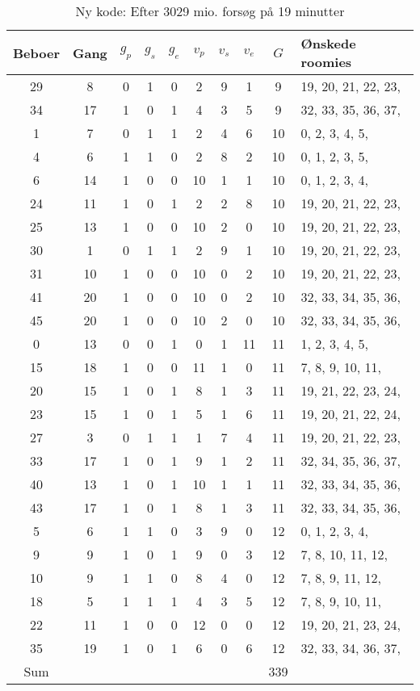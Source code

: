\documentclass[article,oneside,11pt,a4paper]{memoir}
\newenvironment{assignment}[1]{
\begin{table}[h]
\caption{#1}
\footnotesize
\begin{center}
\begin{tabular}{cccccccccl}
\toprule
Beboer & Gang & $g_p$ & $g_s$ & $g_e$ & $v_p$ & $v_s$ & $v_e$ & $G$ & Ønskede roomies \\ \midrule
}{
\bottomrule
\end{tabular}
\end{center}
\end{table}

}
\begin{document}
\begin{assignment}{Ny kode: Efter 3029 mio. forsøg på 19 minutter}
    29 &    8 &   0 &   1 &   0 &   2 &   9 &   1 &  9 &  19, 20, 21, 22, 23, \\
    34 &   17 &   1 &   0 &   1 &   4 &   3 &   5 &  9 &  32, 33, 35, 36, 37, \\
     1 &    7 &   0 &   1 &   1 &   2 &   4 &   6 & 10 &   0,  2,  3,  4,  5, \\
     4 &    6 &   1 &   1 &   0 &   2 &   8 &   2 & 10 &   0,  1,  2,  3,  5, \\
     6 &   14 &   1 &   0 &   0 &  10 &   1 &   1 & 10 &   0,  1,  2,  3,  4, \\
    24 &   11 &   1 &   0 &   1 &   2 &   2 &   8 & 10 &  19, 20, 21, 22, 23, \\
    25 &   13 &   1 &   0 &   0 &  10 &   2 &   0 & 10 &  19, 20, 21, 22, 23, \\
    30 &    1 &   0 &   1 &   1 &   2 &   9 &   1 & 10 &  19, 20, 21, 22, 23, \\
    31 &   10 &   1 &   0 &   0 &  10 &   0 &   2 & 10 &  19, 20, 21, 22, 23, \\
    41 &   20 &   1 &   0 &   0 &  10 &   0 &   2 & 10 &  32, 33, 34, 35, 36, \\
    45 &   20 &   1 &   0 &   0 &  10 &   2 &   0 & 10 &  32, 33, 34, 35, 36, \\
     0 &   13 &   0 &   0 &   1 &   0 &   1 &  11 & 11 &   1,  2,  3,  4,  5, \\
    15 &   18 &   1 &   0 &   0 &  11 &   1 &   0 & 11 &   7,  8,  9, 10, 11, \\
    20 &   15 &   1 &   0 &   1 &   8 &   1 &   3 & 11 &  19, 21, 22, 23, 24, \\
    23 &   15 &   1 &   0 &   1 &   5 &   1 &   6 & 11 &  19, 20, 21, 22, 24, \\
    27 &    3 &   0 &   1 &   1 &   1 &   7 &   4 & 11 &  19, 20, 21, 22, 23, \\
    33 &   17 &   1 &   0 &   1 &   9 &   1 &   2 & 11 &  32, 34, 35, 36, 37, \\
    40 &   13 &   1 &   0 &   1 &  10 &   1 &   1 & 11 &  32, 33, 34, 35, 36, \\
    43 &   17 &   1 &   0 &   1 &   8 &   1 &   3 & 11 &  32, 33, 34, 35, 36, \\
     5 &    6 &   1 &   1 &   0 &   3 &   9 &   0 & 12 &   0,  1,  2,  3,  4, \\
     9 &    9 &   1 &   0 &   1 &   9 &   0 &   3 & 12 &   7,  8, 10, 11, 12, \\
    10 &    9 &   1 &   1 &   0 &   8 &   4 &   0 & 12 &   7,  8,  9, 11, 12, \\
    18 &    5 &   1 &   1 &   1 &   4 &   3 &   5 & 12 &   7,  8,  9, 10, 11, \\
    22 &   11 &   1 &   0 &   0 &  12 &   0 &   0 & 12 &  19, 20, 21, 23, 24, \\
    35 &   19 &   1 &   0 &   1 &   6 &   0 &   6 & 12 &  32, 33, 34, 36, 37, \\
Sum &&&&&&&& 339 & \\
\end{assignment}
\end{document}
